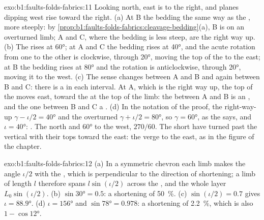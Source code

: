 \begin{solution}{exo:b1:faults-folds-fabrics:11}
Looking north, east is to the right, and planes dipping west rise toward the
right. (a) At B the bedding  the same way as the , more steeply:
by \cref{prop:b1:faults-folds-fabrics:cleavage-bedding}(a), B is on an
overturned limb; A and C, where the bedding is less steep, are the right way
up. (b) The  rises at \ang{60}; at A and C the bedding rises at
\ang{40}, and the acute rotation from one to the other is clockwise, through
\ang{20}, moving the top of the  to the east; at B the bedding rises
at \ang{80} and the rotation is anticlockwise, through \ang{20}, moving it to
the west. (c) The sense changes between A and B and again between B and C:
there is a  in each interval. At A, which is the right way up, the top of
the  moves east, toward the  at the top of the limb: the 
between A and B is an , and the one between B and C a .
(d) In the notation of the proof, the right-way-up  
$\gamma - \iota/2 = \ang{40}$ and the overturned  $\gamma + \iota/2 =
\ang{80}$, so $\gamma = \ang{60}$, as the  says, and $\iota =
\ang{40}$: . The   north and  \ang{60} to the
west,  $270/60$. The short  have turned past the vertical with
their tops toward the east: the  verge to the east, as in the figure of
the chapter.
\end{solution}

\begin{solution}{exo:b1:faults-folds-fabrics:12}
(a) In a symmetric chevron  each limb makes the angle $\iota/2$ with the
, which is perpendicular to the direction of shortening; a limb of
length $l$ therefore spans $l\sin(\iota/2)$ across the , and the whole
layer $L_0\sin(\iota/2)$. (b) $\sin\ang{30} = 0.5$: a shortening of
\qty{50}{\percent}. (c) $\sin(\iota/2) = 0.7$ gives $\iota = \ang{88.9}$.
(d) $\iota = \ang{156}$ and $\sin\ang{78} = 0.978$: a shortening of
\qty{2.2}{\percent}, which is also $1 - \cos\ang{12}$.
\end{solution}

